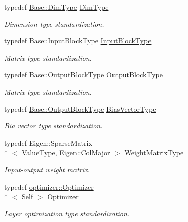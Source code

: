 \begin{DoxyCompactItemize}
typedef \hyperlink{classffnn_1_1layer_1_1internal_1_1_interface_a8d121d0103f254b51e48f7b20a17681f}{Base\-::\-Dim\-Type} \hyperlink{classffnn_1_1layer_1_1_sparsely_connected_aac5a60b2b5f1310acbb39822feb58210}{Dim\-Type}
\begin{DoxyCompactList}\small\item\em Dimension type standardization. \end{DoxyCompactList}\item 
typedef Base\-::\-Input\-Block\-Type \hyperlink{classffnn_1_1layer_1_1_sparsely_connected_ad90fd9b4c687e4dc515cf8ca2796043c}{Input\-Block\-Type}
\begin{DoxyCompactList}\small\item\em Matrix type standardization. \end{DoxyCompactList}\item 
typedef Base\-::\-Output\-Block\-Type \hyperlink{classffnn_1_1layer_1_1_sparsely_connected_aacf4fb49a3f57aba90e55d8d3c63cf45}{Output\-Block\-Type}
\begin{DoxyCompactList}\small\item\em Matrix type standardization. \end{DoxyCompactList}\item 
typedef \hyperlink{classffnn_1_1layer_1_1_hidden_abb03ddc71360cc7ebdab03cd4d1553ee}{Base\-::\-Output\-Block\-Type} \hyperlink{classffnn_1_1layer_1_1_sparsely_connected_ad2d566cbb6c54c8723d79737075b4a00}{Bias\-Vector\-Type}
\begin{DoxyCompactList}\small\item\em Bia vector type standardization. \end{DoxyCompactList}\item 
typedef Eigen\-::\-Sparse\-Matrix\\*
$<$ Value\-Type, Eigen\-::\-Col\-Major $>$ \hyperlink{classffnn_1_1layer_1_1_sparsely_connected_acafafa368b81042965eed9607cad2dbd}{Weight\-Matrix\-Type}
\begin{DoxyCompactList}\small\item\em Input-\/output weight matrix. \end{DoxyCompactList}\item 
typedef \hyperlink{classffnn_1_1optimizer_1_1_optimizer}{optimizer\-::\-Optimizer}\\*
$<$ \hyperlink{classffnn_1_1layer_1_1_sparsely_connected_ad27c96a5f26e2f44fb25bebd9a838666}{Self} $>$ \hyperlink{classffnn_1_1layer_1_1_sparsely_connected_a87466efb64ebf340fa07194c94846ace}{Optimizer}
\begin{DoxyCompactList}\small\item\em \hyperlink{classffnn_1_1layer_1_1_layer}{Layer} optimization type standardization. \end{DoxyCompactList}\end{DoxyCompactItemize}
